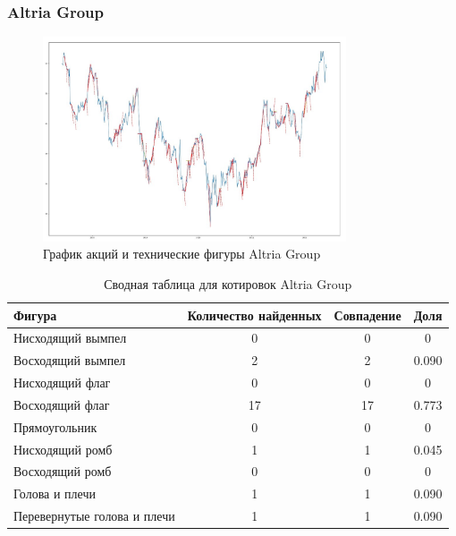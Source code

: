 \documentclass[bachelor, och, coursework]{SCWorks}
\begin{document}
        \subsubsection{Altria Group}
    
        \begin{figure}[H]
            \centering
            \includegraphics[width=0.8\textwidth]{pic/MO.jpg}
            \caption{График акций и технические фигуры Altria Group}
        \end{figure}
       
        \pagebreak

        \begin{table}[!hbt]
            \centering
            \begin{tabular}{|l|c|c|c|}
            \hline
            Фигура                      & \multicolumn{1}{l|}{Количество найденных} & Совпадение & Доля  \\ \hline
            Нисходящий вымпел           & 0                                         & 0          & 0     \\ \hline
            Восходящий вымпел           & 2                                         & 2          & 0.090 \\ \hline
            Нисходящий флаг             & 0                                         & 0          & 0     \\ \hline
            Восходящий флаг             & 17                                        & 17         & 0.773 \\ \hline
            Прямоугольник               & 0                                         & 0          & 0     \\ \hline
            Нисходящий ромб             & 1                                         & 1          & 0.045 \\ \hline
            Восходящий ромб             & 0                                         & 0          & 0     \\ \hline
            Голова и плечи              & 1                                         & 1          & 0.090 \\ \hline
            Перевернутые голова и плечи & 1                                         & 1          & 0.090 \\ \hline
            \end{tabular}
            \captionsetup{justification=centering}
            \caption{Сводная таблица для котировок Altria Group}    
        \end{table}
    
\end{document}
